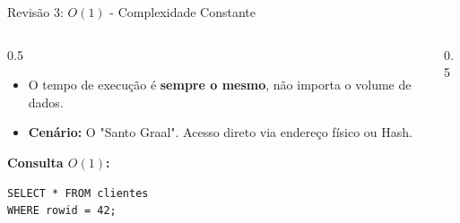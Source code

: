 \documentclass[9pt]{beamer}
\begin{document}
\begin{frame}[fragile]{Revisão 3: $O(1)$ - Complexidade Constante}
    \begin{columns}
        \begin{column}{0.5\textwidth}
            \begin{itemize}
                \item O tempo de execução é \textbf{sempre o mesmo}, não importa o volume de dados.
                \item \textbf{Cenário:} O "Santo Graal". Acesso direto via endereço físico ou Hash.
            \end{itemize}
            \vspace{0.2cm}
            \textbf{Consulta $O(1)$:}
            \begin{lstlisting}[basicstyle=\ttfamily\scriptsize]
SELECT * FROM clientes 
WHERE rowid = 42;
            \end{lstlisting}
        \end{column}
        \begin{column}{0.5\textwidth}
            \begin{center}
            \end{center}
        \end{column}
    \end{columns}
\end{frame}
\end{document}
